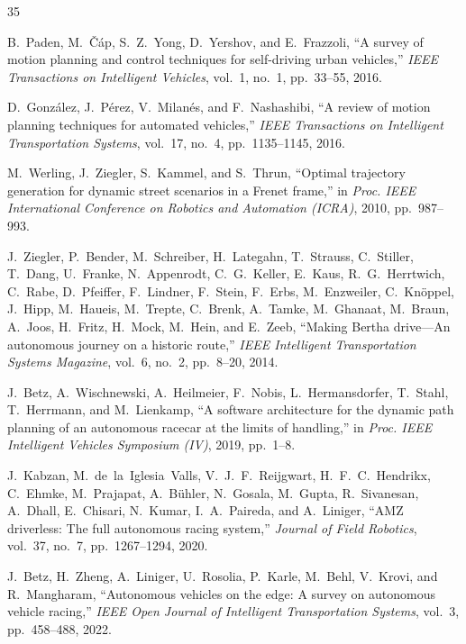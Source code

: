 \documentclass{iopjournal}
\begin{document}
\begin{thebibliography}{35}

B.~Paden, M.~\v{C}\'ap, S.~Z.~Yong, D.~Yershov, and E.~Frazzoli,
``A survey of motion planning and control techniques for self-driving urban
vehicles,'' \emph{IEEE Transactions on Intelligent Vehicles}, vol.~1, no.~1,
pp.~33--55, 2016.

D.~Gonz\'alez, J.~P\'erez, V.~Milan\'es, and F.~Nashashibi,
``A review of motion planning techniques for automated vehicles,''
\emph{IEEE Transactions on Intelligent Transportation Systems}, vol.~17,
no.~4, pp.~1135--1145, 2016.

M.~Werling, J.~Ziegler, S.~Kammel, and S.~Thrun,
``Optimal trajectory generation for dynamic street scenarios in a Frenet
frame,'' in \emph{Proc. IEEE International Conference on Robotics and
Automation (ICRA)}, 2010, pp.~987--993.

J.~Ziegler, P.~Bender, M.~Schreiber, H.~Lategahn, T.~Strauss, C.~Stiller,
T.~Dang, U.~Franke, N.~Appenrodt, C.~G.~Keller, E.~Kaus, R.~G.~Herrtwich,
C.~Rabe, D.~Pfeiffer, F.~Lindner, F.~Stein, F.~Erbs, M.~Enzweiler,
C.~Kn\"oppel, J.~Hipp, M.~Haueis, M.~Trepte, C.~Brenk, A.~Tamke,
M.~Ghanaat, M.~Braun, A.~Joos, H.~Fritz, H.~Mock, M.~Hein, and E.~Zeeb,
``Making Bertha drive---An autonomous journey on a historic route,''
\emph{IEEE Intelligent Transportation Systems Magazine}, vol.~6, no.~2,
pp.~8--20, 2014.

J.~Betz, A.~Wischnewski, A.~Heilmeier, F.~Nobis, L.~Hermansdorfer,
T.~Stahl, T.~Herrmann, and M.~Lienkamp,
``A software architecture for the dynamic path planning of an autonomous
racecar at the limits of handling,'' in \emph{Proc. IEEE Intelligent Vehicles
Symposium (IV)}, 2019, pp.~1--8.

J.~Kabzan, M.~de~la~Iglesia~Valls, V.~J.~F.~Reijgwart, H.~F.~C.~Hendrikx,
C.~Ehmke, M.~Prajapat, A.~B\"uhler, N.~Gosala, M.~Gupta, R.~Sivanesan,
A.~Dhall, E.~Chisari, N.~Kumar, I.~A.~Paireda, and A.~Liniger,
``AMZ driverless: The full autonomous racing system,'' \emph{Journal of Field
Robotics}, vol.~37, no.~7, pp.~1267--1294, 2020.

J.~Betz, H.~Zheng, A.~Liniger, U.~Rosolia, P.~Karle, M.~Behl, V.~Krovi, and
R.~Mangharam,
``Autonomous vehicles on the edge: A survey on autonomous vehicle racing,''
\emph{IEEE Open Journal of Intelligent Transportation Systems}, vol.~3,
pp.~458--488, 2022.


\end{thebibliography}
\end{document}
